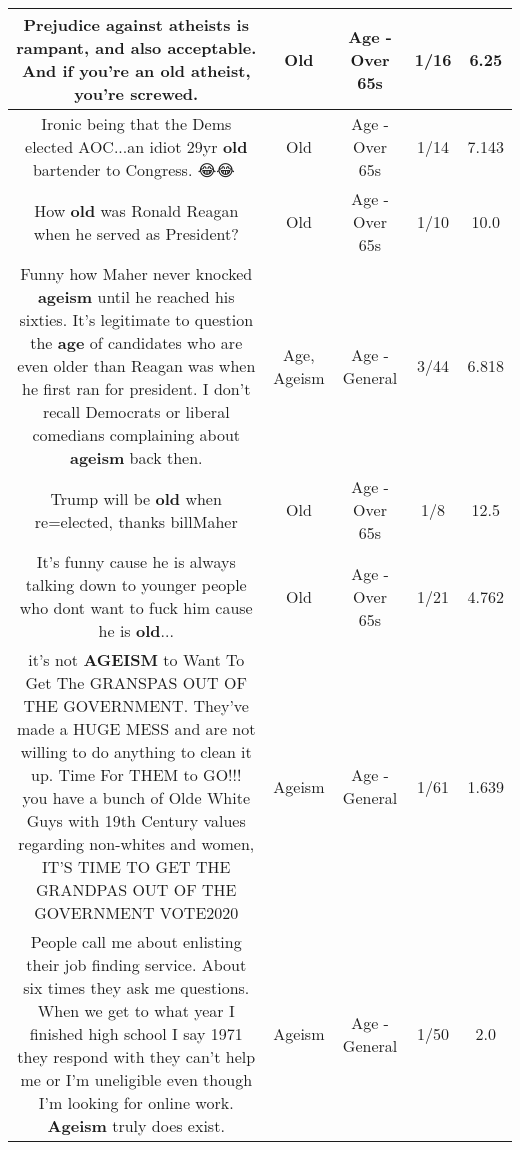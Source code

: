\documentclass[11pt]{article}
\newlength\mylength
\begin{document}
\begin{center}
\begin{longtable}{|C{.65\mylength}|C{.30\mylength}|C{.12\mylength}|C{.12\mylength}|C{.12\mylength}|}
  \small Prejudice against atheists is rampant, and also acceptable. And if you're an \textbf{old} atheist, you're screwed.\normalsize   & Old & Age - Over 65s & 1/16 & 6.25 \\  \hline
  \small Ironic being that the Dems elected AOC...an idiot 29yr \textbf{old} bartender to Congress. 😂😂🤣\normalsize   & Old & Age - Over 65s & 1/14 & 7.143 \\  \hline
  \small How \textbf{old} was Ronald Reagan when he served as President?\normalsize   & Old & Age - Over 65s & 1/10 & 10.0 \\  \hline
  \small Funny how Maher never knocked \textbf{ageism} until he reached his sixties. It's legitimate to question the \textbf{age} of candidates who are even older than Reagan was when he first ran for president. I don't recall Democrats or liberal comedians complaining about \textbf{ageism} back then.\normalsize   & Age, Ageism & Age - General & 3/44 & 6.818 \\  \hline
  \small Trump will be \textbf{old} when re=elected, thanks billMaher\normalsize   & Old & Age - Over 65s & 1/8 & 12.5 \\  \hline
  \small It's funny cause he is always talking down to younger people who dont want to fuck him cause he is \textbf{old}...\normalsize   & Old & Age - Over 65s & 1/21 & 4.762 \\  \hline
  \small it's not \textbf{AGEISM} to Want To Get The GRANSPAS OUT OF THE GOVERNMENT.  They've made a HUGE MESS and are not willing to do anything to clean it up. Time For THEM to GO!!!  you have a bunch of Olde White Guys with 19th Century values regarding non-whites and women, IT'S TIME TO GET THE GRANDPAS OUT OF THE GOVERNMENT  VOTE2020\normalsize   & Ageism & Age - General & 1/61 & 1.639 \\  \hline
  \small People call me about enlisting their job finding service. About six times they ask me questions. When we get to what year I finished high school I say 1971 they respond with they can't help me or I'm uneligible even though I'm looking for online work. \textbf{Ageism} truly does exist.\normalsize   & Ageism & Age - General & 1/50 & 2.0 \\  \hline

\end{longtable}
\end{center}
\end{document}

